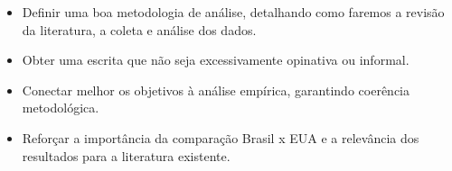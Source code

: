 \documentclass[
	article,
	12pt,
	oneside,
	a4paper,
	english,
	brazil,
	sumario=tradicional
]{abntex2}
\begin{document}
\begin{itemize}
  \item Definir uma boa metodologia de análise, detalhando como faremos a revisão da literatura, a coleta e análise dos dados.
  \item Obter uma escrita que não seja excessivamente opinativa ou informal.
  \item Conectar melhor os objetivos à análise empírica, garantindo coerência metodológica.
  \item Reforçar a importância da comparação Brasil x EUA e a relevância dos resultados para a literatura existente.
\end{itemize}







\newpage

\renewcommand{\refname}{Referências}


\end{document}

